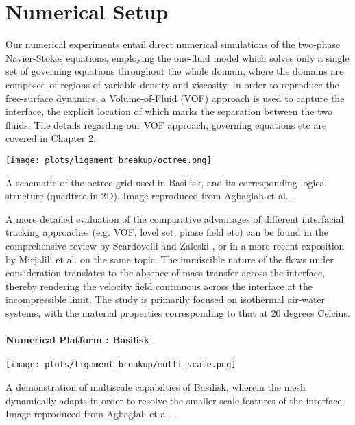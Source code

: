\section{Numerical Setup}
Our numerical experiments entail direct numerical simulations of the two-phase
Navier-Stokes equations, employing the one-fluid model which  
solves only a single set of governing equations throughout the whole domain,
where the domains are composed of regions of variable density and viscosity. 
In order to reproduce the free-surface dynamics, a Volume-of-Fluid 
(VOF) approach is used to capture the interface, the explicit location 
of which marks the separation between the two fluids.
The details regarding our VOF approach, governing equations etc
are covered in Chapter 2. 

\begin{marginfigure}
\centering
\texttt{[image: plots/ligament\_breakup/octree.png]}
\caption{A schematic of the octree grid used in Basilisk, and its
	corresponding logical structure (quadtree in 2D).
	Image reproduced from Agbaglah et al. \cite{agbag}.
	}
\label{octree}
\end{marginfigure}


A more detailed evaluation of the comparative advantages of different  
interfacial tracking approaches (e.g. VOF, level set, phase field etc) 
can be found in the comprehensive review by Scardovelli and Zaleski 
\cite{zaleskiannual}, or in a more recent exposition by  
Mirjalili et al. \cite{mirjalili2017interface} on the same topic.
The immiscible nature of the flows under consideration translates to the 
absence of mass transfer across the interface, thereby rendering the 
velocity field continuous across the interface at the incompressible limit. 
The study is primarily focused on isothermal air-water systems, with 
the material properties corresponding to that at 20 degrees Celcius. 

\paragraph{Numerical Platform : Basilisk}

\begin{marginfigure}
\centering
\texttt{[image: plots/ligament\_breakup/multi\_scale.png]}
\caption{ A demonstration of multiscale capabilties
of Basilisk, wherein the mesh dynamically adapts in order
to resolve the smaller scale features of the interface. 
Image reproduced from Agbaglah et al. \cite{agbag}.
}
\label{amr}
\end{marginfigure}


